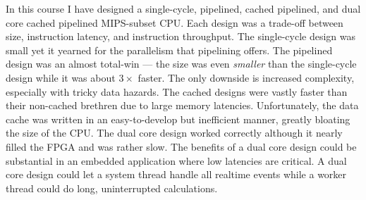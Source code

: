\documentclass[12pt]{article}
\begin{document}
In this course I have designed a single-cycle, pipelined, cached pipelined, and dual core cached pipelined MIPS-subset CPU. Each design was a trade-off between size, instruction latency, and instruction throughput. The single-cycle design was small yet it yearned for the parallelism that pipelining offers. The pipelined design was an almost total-win --- the size was even \emph{smaller} than the single-cycle design while it was about $3 \times$ faster. The only downside is increased complexity, especially with tricky data hazards. The cached designs were vastly faster than their non-cached brethren due to large memory latencies. Unfortunately, the data cache was written in an easy-to-develop but inefficient manner, greatly bloating the size of the CPU. The dual core design worked correctly although it nearly filled the FPGA and was rather slow. The benefits of a dual core design could be substantial in an embedded application where low latencies are critical. A dual core design could let a system thread handle all realtime events while a worker thread could do long, uninterrupted calculations. \\
\end{document}
